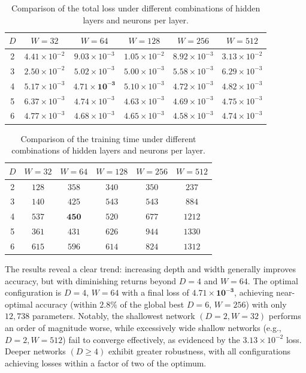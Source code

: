 \documentclass[a4paper,fleqn]{cas-sc}
\begin{document}
\begin{table}[t]
\caption{Comparison of the total loss under different combinations of hidden layers and neurons per layer.}\label{tab:sensitivity}
\begin{tabular*}{\tblwidth}{@{}CCCCCC@{}} \toprule
$D$ & $W=32$ & $W=64$ & $W=128$ & $W=256$ & $W=512$ \\  & $4.41\times10^{-2}$ & $9.03\times10^{-3}$ & $1.05\times10^{-2}$ & $8.92\times10^{-3}$ & $3.13\times10^{-2}$ \\
3 & $2.50\times10^{-2}$ & $5.02\times10^{-3}$ & $5.00\times10^{-3}$ & $5.58\times10^{-3}$ & $6.29\times10^{-3}$ \\
4 & $5.17\times10^{-3}$ & $\mathbf{4.71\times10^{-3}}$ & $5.10\times10^{-3}$ & $4.72\times10^{-3}$ & $4.82\times10^{-3}$ \\
5 & $6.37\times10^{-3}$ & $4.74\times10^{-3}$ & $4.63\times10^{-3}$ & $4.69\times10^{-3}$ & $4.75\times10^{-3}$ \\
6 & $4.77\times10^{-3}$ & $4.68\times10^{-3}$ & $4.65\times10^{-3}$ & $4.58\times10^{-3}$ & $4.74\times10^{-3}$ \\ \bottomrule
\end{tabular*}
\end{table}

\begin{table}[t]
\caption{Comparison of the training time under different combinations of hidden layers and neurons per layer.}\label{tab:sensitivity-time}
\begin{tabular*}{\tblwidth}{@{}CCCCCC@{}} \toprule
$D$ & $W=32$ & $W=64$ & $W=128$ & $W=256$ & $W=512$ \\  & $128$ & $358$ & $340$ & $350$ & $237$ \\
3 & $140$ & $425$ & $543$ & $543$ & $884$ \\
4 & $537$ & $\mathbf{450}$ & $520$ & $677$ & $1212$ \\
5 & $361$ & $431$ & $626$ & $944$ & $1330$ \\
6 & $615$ & $596$ & $614$ & $824$ & $1312$ \\ \bottomrule
\end{tabular*}
\end{table}

The results reveal a clear trend: increasing depth and width generally
improves accuracy, but with diminishing returns beyond $D=4$ and $W=64$.
The optimal configuration is $D=4$, $W=64$ with a final loss of
$\mathbf{4.71\times10^{-3}}$, achieving near-optimal accuracy (within
$2.8\%$ of the global best $D=6$, $W=256$) with only $12{,}738$
parameters. Notably, the shallowest network $(D=2, W=32)$ performs an
order of magnitude worse, while excessively wide shallow networks
(e.g., $D=2, W=512$) fail to converge effectively, as evidenced by
the $3.13\times10^{-2}$ loss. Deeper networks $(D \geq 4)$ exhibit
greater robustness, with all configurations achieving losses within a
factor of two of the optimum.
\end{document}
